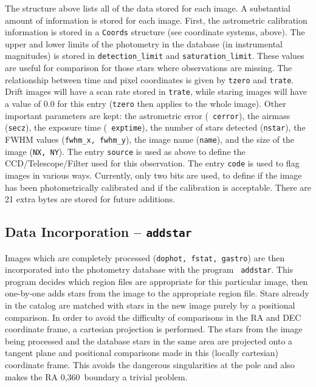 \documentclass{article}
\begin{document}
The structure above lists all of the data stored for each image.  A
substantial amount of information is stored for each image.  First,
the astrometric calibration information is stored in a {\tt Coords}
structure (see coordinate systems, above).  The upper and lower limits
of the photometry in the database (in instrumental magnitudes) is
stored in {\tt detection\_limit} and {\tt saturation\_limit}.  These
values are useful for comparison for those stars where observations
are missing.  The relationship between time and pixel coordinates is
given by {\tt tzero} and {\tt trate}.  Drift images will have a scan
rate stored in {\tt trate}, while staring images will have a value of
0.0 for this entry ({\tt tzero} then applies to the whole image).
Other important parameters are kept: the astrometric error ({\tt
  cerror}), the airmass ({\tt secz}), the exposure time ({\tt
  exptime}), the number of stars detected ({\tt nstar}), the FWHM
values ({\tt fwhm\_x, fwhm\_y}), the image name ({\tt name}), and the
size of the image ({\tt NX, NY}).  The entry {\tt source} is used as
above to define the CCD/Telescope/Filter used for this observation.
The entry {\tt code} is used to flag images in various ways.
Currently, only two bits are used, to define if the image has been
photometrically calibrated and if the calibration is acceptable.
There are 21 extra bytes are stored for future additions.

\subsection{Data Incorporation -- {\tt addstar}}

Images which are completely processed ({\tt dophot, fstat, gastro}) are
then incorporated into the photometry database with the program {\tt 
addstar}.  This program decides which region files are appropriate
for this particular image, then one-by-one adds stars from the image
to the appropriate region file.  Stars already in the catalog are
matched with stars in the new image purely by a positional comparison.
In order to avoid the difficulty of comparisons in the RA and DEC
coordinate frame, a cartesian projection is performed.  The stars from
the image being processed and the database stars in the same area are
projected onto a tangent plane and positional comparisons made in this
(locally cartesian) coordinate frame.  This avoids the dangerous
singularities at the pole and also makes the RA 0,360\degree\ boundary
a trivial problem.  
\end{document}
